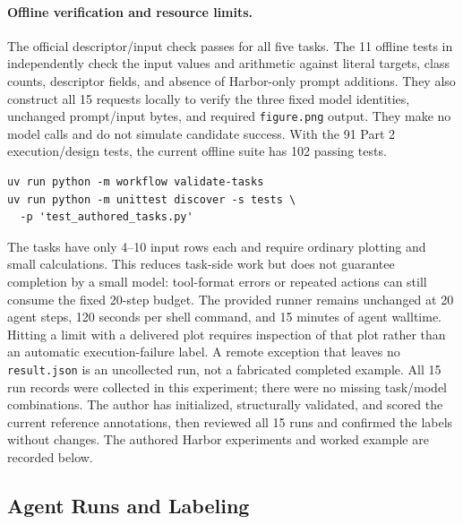 \documentclass[11pt]{article}
\begin{document}
\paragraph{Offline verification and resource limits.}
The official descriptor/input check passes for all five tasks.
The 11 offline tests in  independently
check the input values and arithmetic against literal targets, class counts,
descriptor fields, and absence of Harbor-only prompt additions.
They also construct all 15 requests locally to verify the three fixed model
identities, unchanged prompt/input bytes, and required \texttt{figure.png}
output. They make no model calls and do not simulate candidate success.
With the 91 Part 2 execution/design tests, the current offline suite has
102 passing tests.
\begin{verbatim}
uv run python -m workflow validate-tasks
uv run python -m unittest discover -s tests \
  -p 'test_authored_tasks.py'
\end{verbatim}

The tasks have only 4--10 input rows each and require ordinary plotting and
small calculations. This reduces task-side work but does not guarantee
completion by a small model: tool-format errors or repeated actions can still
consume the fixed 20-step budget.
The provided runner remains unchanged at 20 agent steps, 120 seconds per
shell command, and 15 minutes of agent walltime.
Hitting a limit with a delivered plot requires
inspection of that plot rather than an automatic execution-failure label.
A remote exception that leaves no \texttt{result.json} is an uncollected run,
not a fabricated completed example. All 15 run records were collected in this
experiment; there were no missing task/model combinations.
The author has initialized, structurally validated, and scored the current
reference annotations, then reviewed all 15 runs and confirmed the labels
without changes. The authored Harbor experiments and worked example are
recorded below.

\subsection{Agent Runs and Labeling}
\end{document}
